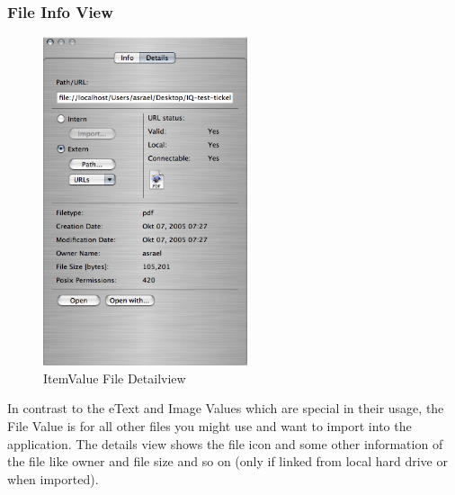 \documentclass[12pt,a4]{article}
\begin{document}
\subsubsection{File Info View}
\label{gui_file_info}
\medskip
% 
\begin{figure}[ht]
\begin{center}
\includegraphics[width=6.0cm]{images/ItemValue_File_DetailView.png}
\end{center}
\caption{ItemValue File Detailview}
\label{image:itemvaluefiledetail}
\end{figure}
\noindent
%
In contrast to the eText and Image Values which are special in their usage, the File Value is for all other files you might use and want to import into the application. The details view shows the file icon and some other information of the file like owner and file size and so on (only if linked from local hard drive or when imported).
\end{document}
